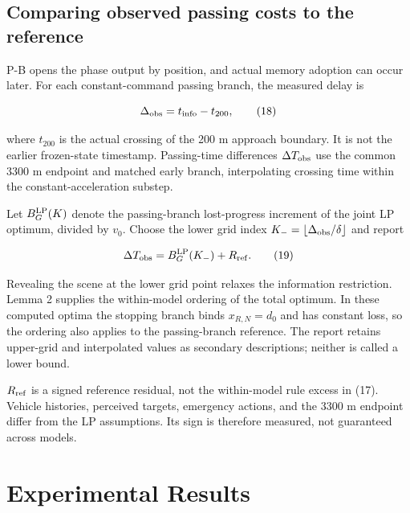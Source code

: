 \documentclass[letterpaper,journal]{IEEEtran}
\begin{document}
\subsection{Comparing observed passing costs to the reference}

P-B opens the phase output by position, and actual memory adoption can occur later. For each constant-command passing branch, the measured delay is

\[\Delta_{\rm obs}=t_{\rm info}-t_{200},\tag{18}\]

where \(t_{200}\) is the actual crossing of the 200 m approach boundary. It is not the earlier frozen-state timestamp. Passing-time differences \(\Delta T_{\rm obs}\) use the common 3300 m endpoint and matched early branch, interpolating crossing time within the constant-acceleration substep.

Let \(B_G^{\rm LP}(K)\) denote the passing-branch lost-progress increment of the joint LP optimum, divided by \(v_0\). Choose the lower grid index \(K_-=\lfloor\Delta_{\rm obs}/\delta\rfloor\) and report

\[\Delta T_{\rm obs}=B_G^{\rm LP}(K_-)+R_{\rm ref}.\tag{19}\]

Revealing the scene at the lower grid point relaxes the information restriction. Lemma 2 supplies the within-model ordering of the total optimum. In these computed optima the stopping branch binds \(x_{R,N}=d_0\) and has constant loss, so the ordering also applies to the passing-branch reference. The report retains upper-grid and interpolated values as secondary descriptions; neither is called a lower bound.

\(R_{\rm ref}\) is a signed reference residual, not the within-model rule excess in (17). Vehicle histories, perceived targets, emergency actions, and the 3300 m endpoint differ from the LP assumptions. Its sign is therefore measured, not guaranteed across models.

\section{Experimental Results}
\end{document}
